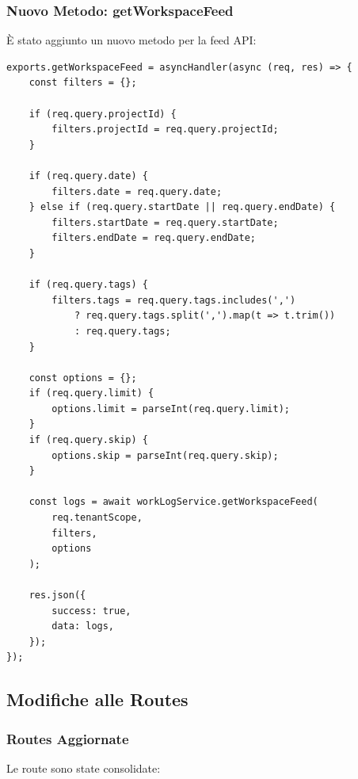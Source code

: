 \documentclass[11pt,a4paper]{article}
\begin{document}
\subsubsection{Nuovo Metodo: getWorkspaceFeed}

È stato aggiunto un nuovo metodo per la feed API:

\begin{lstlisting}[caption=getWorkspaceFeed Controller]
exports.getWorkspaceFeed = asyncHandler(async (req, res) => {
    const filters = {};
    
    if (req.query.projectId) {
        filters.projectId = req.query.projectId;
    }
    
    if (req.query.date) {
        filters.date = req.query.date;
    } else if (req.query.startDate || req.query.endDate) {
        filters.startDate = req.query.startDate;
        filters.endDate = req.query.endDate;
    }
    
    if (req.query.tags) {
        filters.tags = req.query.tags.includes(',') 
            ? req.query.tags.split(',').map(t => t.trim())
            : req.query.tags;
    }
    
    const options = {};
    if (req.query.limit) {
        options.limit = parseInt(req.query.limit);
    }
    if (req.query.skip) {
        options.skip = parseInt(req.query.skip);
    }
    
    const logs = await workLogService.getWorkspaceFeed(
        req.tenantScope, 
        filters, 
        options
    );
    
    res.json({
        success: true,
        data: logs,
    });
});
\end{lstlisting}

\subsection{Modifiche alle Routes}

\subsubsection{Routes Aggiornate}

Le route sono state consolidate:
\end{document}
